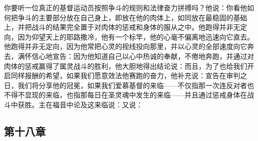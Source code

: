 \par

你要听一位真正的基督运动员按照争斗的规则和法律奋力拼搏吗？他说：你看他如何把争斗的主要部分放在自己身上，即放在他的肉体上，如同放在最稳固的基础上，并把战斗的结果完全置于对肉体的惩戒和身体的服从之中。他跑得并非无定向，因为仰望天上的耶路撒冷，他有一个标竿，他的心毫不偏离地迅速向它直去。他跑得并非无定向，因为他常把心灵的视线投向那里，并以心灵的全部速度向它奔去，满怀信心地宣告：因为他知道自己以心中热诚的奉献，不倦地奔跑，并通过对肉体的惩戒赢得了属灵战斗的胜利，他大胆地得出结论说：而且，为了也给我们开启同样报酬的希望，如果我们愿意效法他赛跑的奋力，他补充说：宣告在审判之日，我们将分享他的冠冕，如果我们爱慕基督的来临——不仅指那一次连反对者也不得不显现的来临，也指那每日在圣灵魂中发生的来临——并且通过惩戒身体在战斗中获胜。主在福音中论及这来临说：又说：\par


\subsection{第十八章}

\par


